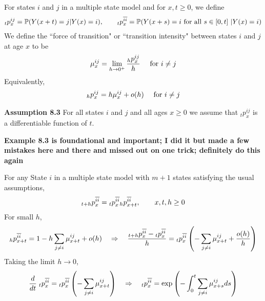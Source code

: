 \documentclass[hidelinks, 12pt]{article}
\theoremstyle{mydefstyle}
\theoremstyle{mythmstyle}
\begin{document}
For states $i$ and $j$ in a multiple state model and for $x, t \ge 0$, we define
\begin{gather*}
\hspace{0mm}_tp_x^{ij} = \mathbb{P}(Y(x+t) = j \vert Y(x) = i), \qquad
\hspace{0mm}_tp_x^{\overline{ii}} = \mathbb{P}(Y(x+s) = i \mbox{ for all $s \in [0, t]$ } \vert Y(x) = i)
\end{gather*}
We define the ``force of transition" or ``transition intensity" between states $i$ and $j$ at age $x$ to be
\begin{gather*}
\mu_x^{ij} = \lim_{h\to0^+} \frac{\hspace{0mm}_hp_x^{ij}}{h} \quad\mbox{ for $i \ne j$}
\end{gather*}
Equivalently,
\begin{gather*}
\hspace{0mm}_hp_x^{ij} = h\mu_x^{ij} + o(h) \quad\mbox{ for $i \ne j$}
\end{gather*}

\textbf{Assumption 8.3} For all states $i$ and $j$ and all ages $x \ge 0$ we assume that $_tp_x^{ij}$ is a differentiable function of $t$.

\color{red}
\textbf{Example 8.3 is foundational and important; I did it but made a few mistakes here and there and missed out on one trick; definitely do this again}
\color{black}

For any State $i$ in a multiple state model with $m+1$ states satisfying the usual assumptions,
\begin{gather*}
\hspace{0mm}_{t+h}p_x^{\overline{ii}} = \hspace{0mm}_tp_x^{\overline{ii}} \hspace{0mm}_hp_{x+t}^{\overline{ii}}, \qquad x, t, h \ge 0
\end{gather*}
For small $h$,
\begin{gather*}
\hspace{0mm}_hp_{x+t}^{\overline{ii}} = 1 - h \sum_{j \ne i} \mu_{x+t}^{ij} + o(h)
\quad\Rightarrow\quad \frac{\hspace{0mm}_{t+h}p_x^{\overline{ii}} - \hspace{0mm}_tp_x^{\overline{ii}}}{h} 
= \hspace{0mm}_tp_x^{\overline{ii}} \left( - \sum_{j\ne i} \mu_{x+t}^{ij} + \frac{o(h)}{h} \right)
\end{gather*}
Taking the limit $h \to 0$,
\begin{gather*}
\frac{d}{dt} \hspace{1mm}_tp_x^{\overline{ii}} = \hspace{0mm}_tp_x^{\overline{ii}} \left( -\sum_{j \ne i} \mu_{x+t}^{ij} \right)
\quad\Rightarrow\quad \hspace{0mm}_tp_x^{\overline{ii}} = \exp\left(-\int_0^t \sum_{j \ne i} \mu_{x+s}^{ij} ds\right)
\end{gather*}
\end{document}
